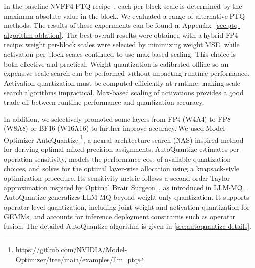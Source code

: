 In the baseline NVFP4 PTQ recipe~\citep{nvpfp4_ptq_default}, each per-block scale is determined by the maximum absolute value in the block. 
We evaluated a range of alternative PTQ methods. The results of these experiments can be found in Appendix~\ref{sec:ptq-algorithm-ablation}.
The best overall results were obtained with a hybrid FP4 recipe: weight per-block scales were selected by minimizing weight MSE, while activation per-block scales continued to use max-based scaling. This choice is both effective and practical. Weight quantization is calibrated offline so an expensive scale search can be performed without impacting runtime performance. Activation quantization must be computed efficiently at runtime, making scale search algorithms impractical. Max-based scaling of activations provides a good trade-off between runtime performance and quantization accuracy.


In addition, we selectively promoted some layers from FP4 (W4A4) to FP8 (W8A8) or BF16 (W16A16) to further improve accuracy.
We used Model-Optimizer AutoQuantize \footnote{\url{https://github.com/NVIDIA/Model-Optimizer/tree/main/examples/llm_ptq}}, a neural architecture search (NAS) inspired method for deriving optimal mixed-precision assignments. AutoQuantize estimates per-operation sensitivity, models the performance cost of available quantization choices, and solves for the optimal layer-wise allocation using a knapsack-style optimization procedure. Its sensitivity metric follows a second-order Taylor approximation inspired by Optimal Brain Surgeon~\citep{obs}, as introduced in LLM-MQ~\citep{llmmq}.
AutoQuantize generalizes LLM-MQ beyond weight-only quantization. It supports operator-level quantization, including joint weight-and-activation quantization for GEMMs, and accounts for inference deployment constraints such as operator fusion. The detailed AutoQuantize algorithm is given in \ref{sec:autoquantize-details}.

